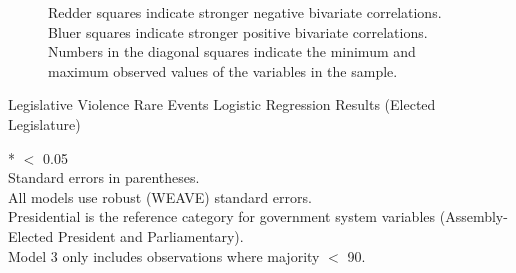 \documentclass[a4paper]{article}\usepackage{graphicx, color}
\makeatletter
\newenvironment{kframe}{%
 \def\at@end@of@kframe{}%
 \ifinner\ifhmode%
  \def\at@end@of@kframe{\end{minipage}}%
  \begin{minipage}{\columnwidth}%
 \fi\fi%
 \def\FrameCommand##1{\hskip\@totalleftmargin \hskip-\fboxsep
 \colorbox{shadecolor}{##1}\hskip-\fboxsep
     \hskip-\linewidth \hskip-\@totalleftmargin \hskip\columnwidth}%
 \MakeFramed {\advance\hsize-\width
   \@totalleftmargin\z@ \linewidth\hsize
   \@setminipage}}%
 {\par\unskip\endMakeFramed%
 \at@end@of@kframe}
\makeatother
\begin{document}
{{\begin{landscape}
\begin{figure}[t]
\begin{center}

    \end{center}
    \begin{singlespace}
        {\scriptsize{Redder squares indicate stronger negative bivariate correlations. \\
        Bluer squares indicate stronger positive bivariate correlations. \\
        Numbers in the diagonal squares indicate the minimum and maximum observed values of the variables in the sample.
        }}
    \end{singlespace} 
\end{figure}
\end{landscape}


\begin{landscape}
\begin{table}[htp]
    \caption{Legislative Violence Rare Events Logistic Regression Results (Elected Legislature)}
    \label{outputTable.dem}
    \vspace{0.25cm}
    {\tiny{
    \begin{center}
\begin{kframe}


{\ttfamily\noindent\bfseries\color{errorcolor}{\#\# Error: unable to find an inherited method for function 'extract' for signature '"zelig"'}}\end{kframe}

    \end{center}
    \begin{singlespace}
        {*} $<$ 0.05 \\
        Standard errors in parentheses. \\
        All models use robust (WEAVE) standard errors. \\
        Presidential is the reference category for government system variables (Assembly-Elected President and Parliamentary). \\
        Model 3 only includes observations where majority $<$ 90.
    \end{singlespace}
    }}
\end{table}
\end{landscape}

}}
\end{document}
